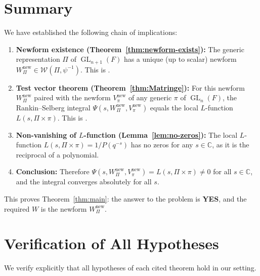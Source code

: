 \documentclass[12pt]{article}
\theoremstyle{definition}
\DeclareMathOperator{\GL}{GL}
\begin{document}
\section{Summary}
\label{sec:summary}

We have established the following chain of implications:

\begin{enumerate}
\item \textbf{Newform existence (Theorem~\ref{thm:newform-exists}):} The generic
  representation $\Pi$ of $\GL_{n+1}(F)$ has a unique (up to scalar) newform
  $W_\Pi^{\mathrm{new}} \in \mathcal{W}(\Pi,\psi^{-1})$.  This is
  \cite[Theorems~(1),(2)]{JPSS81}.

\item \textbf{Test vector theorem (Theorem~\ref{thm:Matringe}):} For this newform
  $W_\Pi^{\mathrm{new}}$ paired with the newform $V_\pi^{\mathrm{new}}$ of any
  generic $\pi$ of $\GL_n(F)$, the Rankin--Selberg integral
  $\Psi(s, W_\Pi^{\mathrm{new}}, V_\pi^{\mathrm{new}})$ equals the local
  $L$-function $L(s,\Pi\times\pi)$.  This is \cite[Theorem~1.1]{Mat13}.

\item \textbf{Non-vanishing of $L$-function (Lemma~\ref{lem:no-zeros}):}
  The local $L$-function $L(s,\Pi\times\pi) = 1/P(q^{-s})$ has no zeros for
  any $s \in \mathbb{C}$, as it is the reciprocal of a polynomial.

\item \textbf{Conclusion:} Therefore $\Psi(s, W_\Pi^{\mathrm{new}},
  V_\pi^{\mathrm{new}}) = L(s,\Pi\times\pi) \neq 0$ for all $s \in \mathbb{C}$,
  and the integral converges absolutely for all $s$.
\end{enumerate}

This proves Theorem~\ref{thm:main}: the answer to the problem is \textbf{YES},
and the required $W$ is the newform $W_\Pi^{\mathrm{new}}$.

\section{Verification of All Hypotheses}
\label{sec:verification}

We verify explicitly that all hypotheses of each cited theorem hold in our setting.
\end{document}
